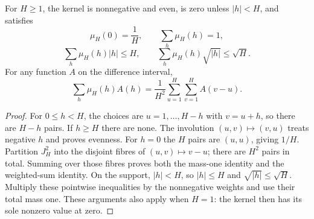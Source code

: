 \begin{lemma}
\leanok
\label{core:fejer-identities}
For $H\geq1$, the kernel is nonnegative and even, is zero unless
$|h|<H$, and satisfies
\[
 \mu_H(0)=\frac1H,\qquad \sum_h\mu_H(h)=1,
\]
\[
 \sum_h\mu_H(h)|h|\leq H,\qquad
 \sum_h\mu_H(h)\sqrt{|h|}\leq\sqrt H.
\]
For any function $A$ on the difference interval,
\[
 \sum_h\mu_H(h)A(h)
   =\frac1{H^2}\sum_{u=1}^H\sum_{v=1}^H A(v-u).
\]
\end{lemma}
\begin{proof}
For $0\leq h<H$, the choices are $u=1,\ldots,H-h$ with
$v=u+h$, so there are $H-h$ pairs.  If $h\geq H$ there are none.
The involution $(u,v)\mapsto(v,u)$ treats negative $h$ and proves
evenness.  For $h=0$ the $H$ pairs are $(u,u)$, giving $1/H$.
Partition $J_H^2$ into the disjoint fibres of $(u,v)\mapsto v-u$;
there are $H^2$ pairs in total.  Summing over those fibres proves
both the mass-one identity and the weighted-sum identity.  On the
support, $|h|<H$, so $|h|\leq H$ and $\sqrt{|h|}\leq\sqrt H$.
Multiply these pointwise inequalities by the nonnegative weights
and use their total mass one.  These arguments also apply when
$H=1$: the kernel then has its sole nonzero value at zero.
\end{proof}

